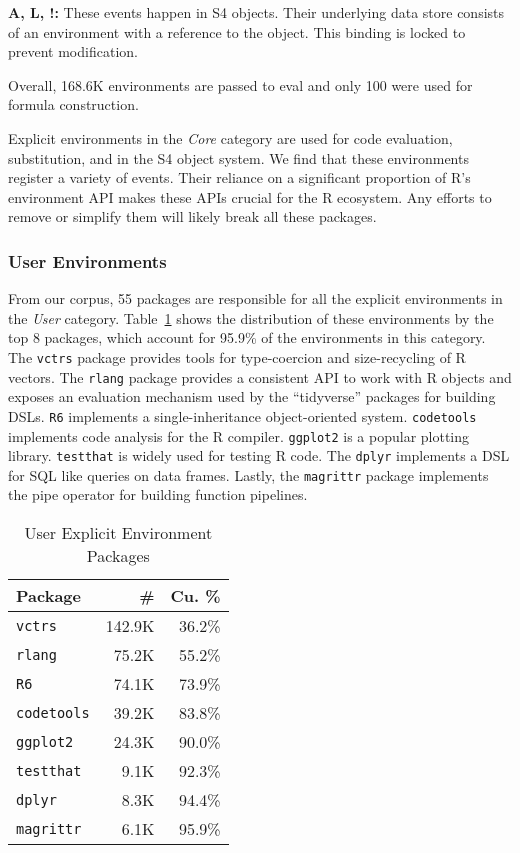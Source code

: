 \documentclass[10pt,review,sigplan,anonymous=true,authorversion=true,nonacm=true]{acmart}
\newcommand{\code}[1]{\lstinline |#1|\xspace}
\begin{document}
\noindent
\textbf{A, L, !:} These events happen in S4 objects. Their underlying data store
consists of an environment with a reference to the object. This binding is
locked to prevent modification.

Overall, 168.6K environments are passed to eval and only 100 were used for
formula construction.

Explicit environments in the \emph{Core} category are used for code evaluation,
substitution, and in the S4 object system. We find that these environments
register a variety of events. Their reliance on a significant proportion of R's
environment API makes these APIs crucial for the R ecosystem. Any efforts to
remove or simplify them will likely break all these packages.

\subsubsection{User Environments}

From our corpus, 55 packages are responsible for all the explicit environments
in the \emph{User} category. Table~\ref{table:user_explicit_pack} shows the
distribution of these environments by the top 8 packages, which account for
95.9\% of the environments in this category. The \code{vctrs} package provides
tools for type-coercion and size-recycling of R vectors. The \code{rlang}
package provides a consistent API to work with R objects and exposes an
evaluation mechanism used by the ``tidyverse'' packages for building DSLs.
\code{R6} implements a single-inheritance object-oriented system.
\code{codetools} implements code analysis for the R compiler. \code{ggplot2} is
a popular plotting library. \code{testthat} is widely used for testing R code.
The \code{dplyr} implements a DSL for SQL like queries on data frames.
Lastly, the \code{magrittr} package implements the pipe operator for building
function pipelines.

\begin{table}[!h]
  \small
  \caption{User Explicit Environment Packages} \label{table:user_explicit_pack}
  \centering
  \begin{tabular}{lrr}
    \toprule
    \textbf{Package}&\textbf{\#}&\textbf{Cu. \%}\\
    \midrule
    \code{vctrs}&142.9K&36.2\%\\
    \code{rlang}&75.2K&55.2\%\\
    \code{R6}&74.1K&73.9\%\\
    \code{codetools}&39.2K&83.8\%\\
    \code{ggplot2}&24.3K&90.0\%\\
    \code{testthat}&9.1K&92.3\%\\
    \code{dplyr}&8.3K&94.4\%\\
    \code{magrittr}&6.1K&95.9\%\\
    \bottomrule
  \end{tabular}
\end{table}
\end{document}
